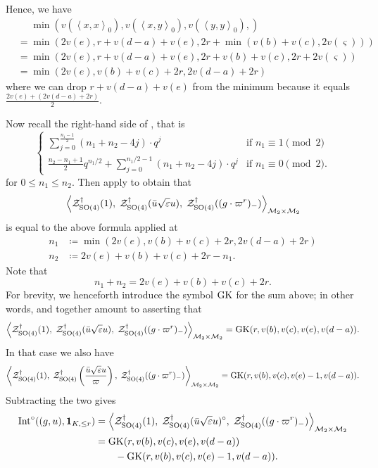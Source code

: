 Hence, we have
\begin{align*}
  &\phantom= \min\left(
    v(\left\langle x,x \right\rangle _0),
    v(\left\langle x,y \right\rangle _0),
    v(\left\langle y,y \right\rangle _0),
  \right) \\
  &= \min\left( 2v(e), r+v(d-a)+v(e), 2r+\min(v(b)+v(c), 2v(\varsigma)) \right) \\
  &= \min\left( 2v(e), r+v(d-a)+v(e), 2r+v(b)+v(c), 2r+2v(\varsigma) \right) \\
  &= \min\left( 2v(e), v(b)+v(c)+2r, 2v(d-a)+2r \right)
\end{align*}
where we can drop $r+v(d-a)+v(e)$ from the minimum because it equals
$\frac{2v(e) + (2v(d-a)+2r)}{2}$.

Now recall the right-hand side of , that is
\[
  \begin{cases}
    \sum_{j=0}^{\frac{n_1-1}{2}} (n_1+n_2-4j) \cdot q^j & \text{if } n_1 \equiv 1 \pmod 2 \\
    \frac{n_2-n_1+1}{2} q^{n_1/2} + \sum_{j=0}^{n_1/2-1} (n_1+n_2-4j) \cdot q^j & \text{if } n_1 \equiv 0 \pmod 2.
  \end{cases}
\]
for $0 \le n_1 \le n_2$.
Then apply  to obtain that
\[
  \left< \mathcal Z^{\dagger}_{\operatorname{SO}(4)}(1), \;
    \mathcal Z^{\dagger}_{\operatorname{SO}(4)}(\bar u \sqrt{\varepsilon} u), \;
    \mathcal Z^{\dagger}_{\operatorname{SO}(4)}((g \cdot \varpi^r)_-) \right>_{\mathcal M_2 \times \mathcal M_2}
\]
is equal to the above formula applied at
\begin{align*}
  n_1 &\coloneqq \min(2v(e), v(b)+v(c)+2r, 2v(d-a)+2r) \\
  n_2 &\coloneqq 2v(e) + v(b) + v(c) + 2r - n_1.
\end{align*}
Note that
\[ n_1 + n_2 = 2v(e) + v(b) + v(c) + 2r. \]
For brevity, we henceforth introduce the symbol $\operatorname{GK}$ for the sum above;
in other words,  and 
together amount to asserting that
\[ \left< \mathcal Z^{\dagger}_{\operatorname{SO}(4)}(1), \; \mathcal Z^{\dagger}_{\operatorname{SO}(4)}(\bar u \sqrt{\varepsilon} u), \; \mathcal Z^{\dagger}_{\operatorname{SO}(4)}((g \cdot \varpi^r)_-) \right>_{\mathcal M_2 \times \mathcal M_2}
    = \operatorname{GK}(r, v(b), v(c), v(e), v(d-a)). \]
In that case we also have
\[
  \left< \mathcal Z^{\dagger}_{\operatorname{SO}(4)}(1), \;
    \mathcal Z^{\dagger}_{\operatorname{SO}(4)}\left(\frac{\bar u \sqrt{\varepsilon} u}{\varpi}\right), \;
    \mathcal Z^{\dagger}_{\operatorname{SO}(4)}((g \cdot \varpi^r)_-) \right>_{\mathcal M_2 \times \mathcal M_2}
    = \operatorname{GK}(r, v(b), v(c), v(e)-1, v(d-a)). \]
Subtracting the two gives
\begin{equation}
  \begin{aligned}
    \operatorname{Int}^\circ((g,u), \mathbf{1}_{K, \le r}) &=
      \left< \mathcal Z^{\dagger}_{\operatorname{SO}(4)}(1), \;
        \mathcal Z^{\dagger}_{\operatorname{SO}(4)}(\bar u \sqrt{\varepsilon} u)^\circ, \;
        \mathcal Z^{\dagger}_{\operatorname{SO}(4)}((g \cdot \varpi^r)_-) \right>_{\mathcal M_2 \times \mathcal M_2} \\
    &= \operatorname{GK}(r, v(b), v(c), v(e), v(d-a)) \\
    &\qquad- \operatorname{GK}(r, v(b), v(c), v(e)-1, v(d-a)).
  \end{aligned}
  \label{eq:int_subtract}
\end{equation}

